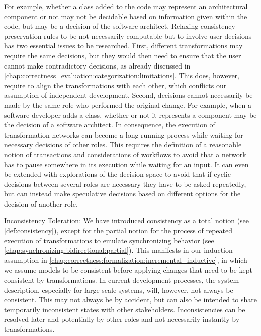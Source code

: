 \begin{properdescription}
For example, whether a class added to the code may represent an architectural component or not may not be decidable based on information given within the code, but may be a decision of the software architect.
Relaxing consistency preservation rules to be not necessarily computable but to involve user decisions has two essential issues to be researched.
First, different transformations may require the same decisions, but they would then need to ensure that the user cannot make contradictory decisions, as already discussed in \autoref{chap:correctness_evaluation:categorization:limitations}.
This does, however, require to align the transformations with each other, which conflicts our assumption of independent development.
Second, decisions cannot necessarily be made by the same role who performed the original change.
For example, when a software developer adds a class, whether or not it represents a component may be the decision of a software architect.
In consequence, the execution of transformation networks can become a long-running process while waiting for necessary decisions of other roles.
This requires the definition of a reasonable notion of transactions and considerations of workflows to avoid that a network has to pause somewhere in its execution while waiting for an input.
It can even be extended with explorations of the decision space to avoid that if cyclic decisions between several roles are necessary they have to be asked repeatedly, but can instead make speculative decisions based on different options for the decision of another role.
\item[Inconsistency Toleration:]
We have introduced consistency as a total notion (see \autoref{def:consistency}), except for the partial notion for the process of repeated execution of transformations to emulate synchronizing behavior (see \autoref{chap:synchronizing:bidirectional:partial}).
This manifests in our induction assumption in \autoref{chap:correctness:formalization:incremental_inductive}, in which we assume models to be consistent before applying changes that need to be kept consistent by transformations.
In current development processes, the system description, especially for large scale systems, will, however, not always be consistent.
This may not always be by accident, but can also be intended to share temporarily inconsistent states with other stakeholders. 
Inconsistencies can be resolved later and potentially by other roles and not necessarily instantly by transformations.

\end{properdescription}
